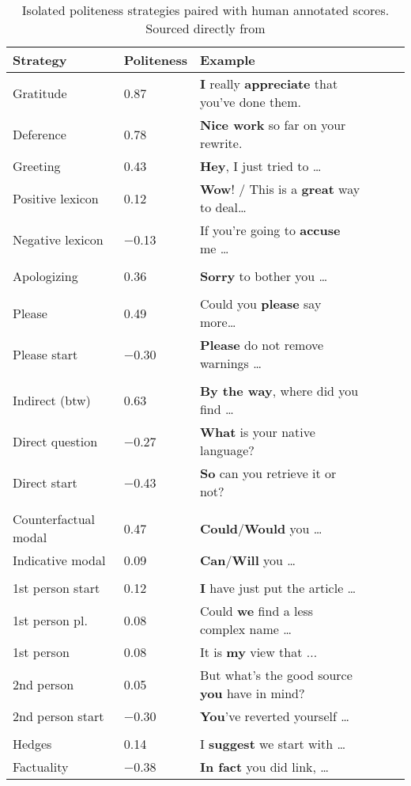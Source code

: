 \documentclass{article}
\begin{document}
\begin{table}[]
    \begin{center}
    \caption{Isolated politeness strategies paired with human annotated scores. Sourced directly from \protect\cite[p. 5]{CAP}}
    \begin{tabular}{lllllr}
    \hline
    \textbf{Strategy} & \textbf{Politeness} & \textbf{Example} \\
    \hline
         Gratitude & 0.87 & \textbf{I} really \textbf{appreciate} that you've done them.  \\
         Deference & 0.78 & \textbf{Nice work} so far on your rewrite. \\ 
         Greeting & 0.43 & \textbf{Hey}, I just tried to \ldots \\ 
         Positive lexicon & 0.12 &  \textbf{Wow}! / This is a \textbf{great} way to deal\ldots\\
         Negative lexicon & $-$0.13 & If you're going to \textbf{accuse} me \ldots \\
         & \\
         Apologizing & 0.36 & \textbf{Sorry} to bother you \ldots \\
         & \\
         Please & 0.49 & Could you \textbf{please} say more\ldots \\
         Please start & $-$0.30 & \textbf{Please} do not remove warnings \ldots \\
         & \\
         Indirect (btw) & 0.63 &\textbf{By the way}, where did you find \ldots \\
         Direct question & $-$0.27 & \textbf{What} is your native language? \\
         Direct start & $-$0.43 & \textbf{So} can you retrieve it or not? \\
         & \\
         Counterfactual modal & 0.47 & \textbf{Could}/\textbf{Would} you \ldots \\
         Indicative modal & 0.09 & \textbf{Can}/\textbf{Will} you \ldots \\
         & \\
         1st person start & 0.12 & \textbf{I} have just put the article \ldots \\  
         1st person pl. & 0.08 & Could \textbf{we} find a less complex name \ldots \\
         1st person & 0.08 & It is \textbf{my} view that ... \\ 
         2nd person & 0.05 & But what's the good source \textbf{you} have in mind? \\ 
         2nd person start & $-$0.30 & \textbf{You}'ve reverted yourself \ldots \\ 
         & \\
         Hedges & 0.14 & I \textbf{suggest} we start with \ldots \\
         Factuality & $-$0.38 & \textbf{In fact} you did link, \ldots \\
    \hline
    \end{tabular}
    \label{strategies}
    \end{center}
\end{table}
\end{document}
